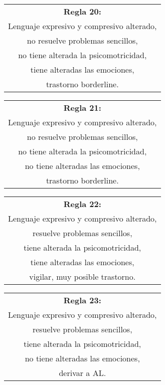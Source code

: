 \documentclass[letterpaper,12pt]{article}
\begin{document}
\begin{center}
	\begin{tabular}{|c|}
		\hline 
		\textbf{Regla 20:} \\
		Lenguaje expresivo y compresivo alterado,\\
		no resuelve problemas sencillos,\\
		no tiene alterada la psicomotricidad,\\
		tiene alteradas las emociones,\\
		trastorno borderline.\\
	\hline 
\end{tabular} 
\end{center}	
		
\begin{center}
	\begin{tabular}{|c|}
		\hline 
		\textbf{Regla 21:} \\
		Lenguaje expresivo y compresivo alterado,\\
		no resuelve problemas sencillos,\\
		no tiene alterada la psicomotricidad,\\
		no tiene alteradas las emociones,\\
		trastorno borderline.\\
	\hline 
\end{tabular} 
\end{center}	
		
\begin{center}
	\begin{tabular}{|c|}
		\hline 
		\textbf{Regla 22:} \\
		Lenguaje expresivo y compresivo alterado,\\
		resuelve problemas sencillos,\\
		tiene alterada la psicomotricidad,\\
		tiene alteradas las emociones,\\
		vigilar, muy posible trastorno.\\
	\hline 
\end{tabular} 
\end{center}	
		
\begin{center}
	\begin{tabular}{|c|}
		\hline 
		\textbf{Regla 23:} \\
		Lenguaje expresivo y compresivo alterado,\\
		resuelve problemas sencillos,\\
		tiene alterada la psicomotricidad,\\
		no tiene alteradas las emociones,\\
		derivar a AL. \\
	\hline 
\end{tabular} 
\end{center}	
		
\end{document}
